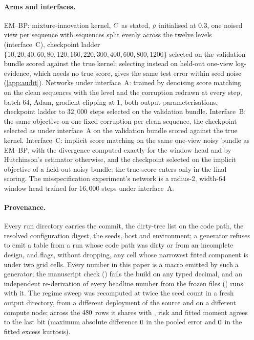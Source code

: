 \paragraph{Arms and interfaces.}
EM--BP: mixture-innovation kernel, $C$ as stated, $\rho$ initialised at $0.3$, one
noised view per sequence with sequences split evenly across the twelve levels
(interface~C), checkpoint ladder $\{10,20,40,60,80,120,160,220,300,400,600,800,1200\}$
selected on the validation bundle scored against the true kernel; selecting instead on
held-out one-view log-evidence, which needs no true score, gives the same test error
within seed noise (\cref{app:audit}). Networks under interface~A: trained by denoising
score matching on the clean sequences with the level and the corruption redrawn at every
step, batch $64$, Adam, gradient clipping at $1$, both output parameterisations,
checkpoint ladder to $32{,}000$ steps selected on the validation bundle. Interface~B: the
same objective on one fixed corruption per clean sequence, the checkpoint selected as
under interface~A on the validation bundle scored against the true kernel. Interface~C: implicit score
matching on the same one-view noisy bundle as EM--BP, with the divergence computed
exactly for the window head and by Hutchinson's estimator otherwise, and the checkpoint
selected on the implicit objective of a held-out noisy bundle; the true score enters
only in the final scoring. The misspecification experiment's network is a radius-2,
width-64 window head trained for $16{,}000$ steps under interface~A.

\paragraph{Provenance.}
Every run directory carries the commit, the dirty-tree list on the code path, the
resolved configuration digest, the seeds, host and environment; a generator refuses to
emit a table from a run whose code path was dirty or from an incomplete design, and
flags, without dropping, any cell whose narrowest fitted component is under two grid
cells. Every number in this paper is a macro emitted by such a generator; the manuscript
check () fails the build on any typed decimal, and
an independent re-derivation of every headline number from the frozen files
() runs with it. The regime sweep was recomputed at
twice the seed count in a fresh output directory, from a different deployment of the
source and on a different compute node; across the $480$ rows it shares with
\regReproSource{}, \regReproExact{} risk and \regReproExact{} fitted moment agrees to
the last bit (maximum absolute difference $0$ in the pooled error and
$0$ in the fitted excess kurtosis).
